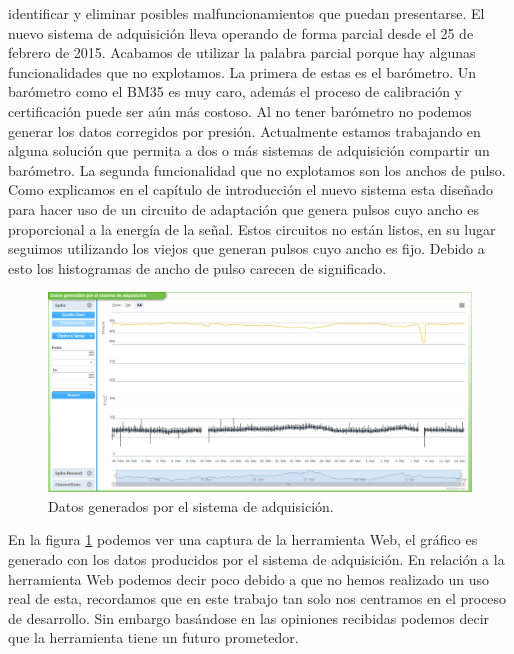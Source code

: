 	identificar y eliminar posibles malfuncionamientos que puedan presentarse. El nuevo sistema de adquisición lleva operando de forma parcial
	desde el 25 de febrero de 2015. Acabamos de utilizar la palabra parcial porque hay algunas funcionalidades que no explotamos. La primera de
	estas es el barómetro. Un barómetro como el BM35 es muy caro, además el proceso de calibración y certificación puede ser aún más costoso. Al
	no tener barómetro no podemos generar los datos corregidos por presión. Actualmente estamos trabajando en alguna solución que permita a dos o
	más sistemas de adquisición compartir un barómetro. La segunda funcionalidad que no explotamos son los anchos de pulso. Como explicamos en el
	capítulo de introducción el nuevo sistema esta diseñado para hacer uso de un circuito de adaptación que genera pulsos cuyo ancho es
	proporcional a la energía de la señal. Estos circuitos no están listos, en su lugar seguimos utilizando los viejos que generan pulsos cuyo
	ancho es fijo. Debido a esto los histogramas de ancho de pulso carecen de significado. 
	\begin{figure}[h]
		\centering
		\includegraphics[keepaspectratio, width=1\textwidth]{./img/resultados.png}
		\caption{Datos generados por el sistema de adquisición.}   
		\label{fig:resultados}
	\end{figure}
	\par
	En la figura \ref{fig:resultados} podemos ver una captura de la herramienta Web, el gráfico es generado con los datos producidos por el
	sistema de adquisición. En relación a la herramienta Web podemos decir poco debido a que no hemos realizado un uso real de esta, recordamos
	que en este trabajo tan solo nos centramos en el proceso de desarrollo. Sin embargo basándose en las opiniones recibidas podemos decir que la
	herramienta tiene un futuro prometedor.

